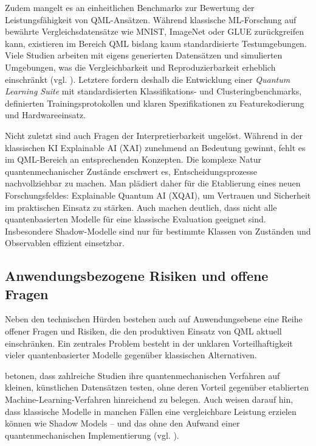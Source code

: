 Zudem mangelt es an einheitlichen Benchmarks zur Bewertung der Leistungsfähigkeit von QML-Ansätzen. Während klassische ML-Forschung auf bewährte Vergleichsdatensätze wie MNIST, ImageNet oder GLUE zurückgreifen kann, existieren im Bereich QML bislang kaum standardisierte Testumgebungen. Viele Studien arbeiten mit eigens generierten Datensätzen und simulierten Umgebungen, was die Vergleichbarkeit und Reproduzierbarkeit erheblich einschränkt (vgl. \cite{gujjuQuantumMachineLearning2024}).
Letztere fordern deshalb die Entwicklung einer \textit{Quantum Learning Suite} mit standardisierten Klassifikations- und Clusteringbenchmarks, definierten Trainingsprotokollen und klaren Spezifikationen zu Featurekodierung und Hardwareeinsatz.

Nicht zuletzt sind auch Fragen der Interpretierbarkeit ungelöst. Während in der klassischen KI Explainable AI (XAI) zunehmend an Bedeutung gewinnt, fehlt es im QML-Bereich an entsprechenden Konzepten. Die komplexe Natur quantenmechanischer Zustände erschwert es, Entscheidungsprozesse nachvollziehbar zu machen. Man plädiert daher für die Etablierung eines neuen Forschungsfeldes: Explainable Quantum AI (XQAI), um Vertrauen und Sicherheit im praktischen Einsatz zu stärken. Auch \cite{jerbiShadowsQuantumMachine2024} machen deutlich, dass nicht alle quantenbasierten Modelle für eine klassische Evaluation geeignet sind. Insbesondere Shadow-Modelle sind nur für bestimmte Klassen von Zuständen und Observablen effizient einsetzbar.

\subsection{Anwendungsbezogene Risiken und offene Fragen}
Neben den technischen Hürden bestehen auch auf Anwendungsebene eine Reihe offener Fragen und Risiken, die den produktiven Einsatz von QML aktuell einschränken. Ein zentrales Problem besteht in der unklaren Vorteilhaftigkeit vieler quantenbasierter Modelle gegenüber klassischen Alternativen. 

\cite{bowlesBetterClassicalSubtle2024a} betonen, dass zahlreiche Studien ihre quantenmechanischen Verfahren auf kleinen, künstlichen Datensätzen testen, ohne deren Vorteil gegenüber etablierten Machine-Learning-Verfahren hinreichend zu belegen. Auch \cite{jerbiShadowsQuantumMachine2024} weisen darauf hin, dass klassische Modelle in manchen Fällen eine vergleichbare Leistung erzielen können wie Shadow Models – und das ohne den Aufwand einer quantenmechanischen Implementierung (vgl. \cite{jerbiShadowsQuantumMachine2024}).


